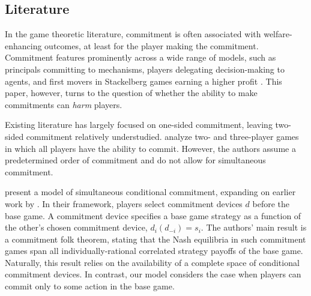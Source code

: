 \documentclass[letterpaper]{article}
\theoremstyle{definition}
\begin{document}

\subsection*{Literature}
In the game theoretic literature, commitment is often associated with welfare-enhancing outcomes, at least for the player making the commitment. Commitment features prominently across a wide range of models, such as principals committing to mechanisms, players delegating decision-making to agents, and first movers in Stackelberg games earning a higher profit \citep[see the discussion in][]{kalai_commitment_2010}. This paper, however, turns to the question of whether the ability to make commitments can \textit{harm} players.

Existing literature has largely focused on one-sided commitment, leaving two-sided commitment relatively understudied. \citet{harrenstein_commitment_2007} analyze two- and three-player games in which all players have the ability to commit. However, the authors assume a predetermined order of commitment and do not allow for simultaneous commitment.

\citet{kalai_commitment_2010} present a model of simultaneous conditional commitment, expanding on earlier work by \citet{tennenholtz_program_2004}. In their framework, players select commitment devices $d$ before the base game. A commitment device specifies a base game strategy as a function of the other's chosen commitment device, $d_i(d_{-i}) = s_i$. The authors' main result is a commitment folk theorem, stating that the Nash equilibria in such commitment games span all individually-rational correlated strategy payoffs of the base game. Naturally, this result relies on the availability of a complete space of conditional commitment devices. In contrast, our model considers the case when players can commit only to some action in the base game. 

\end{document}
